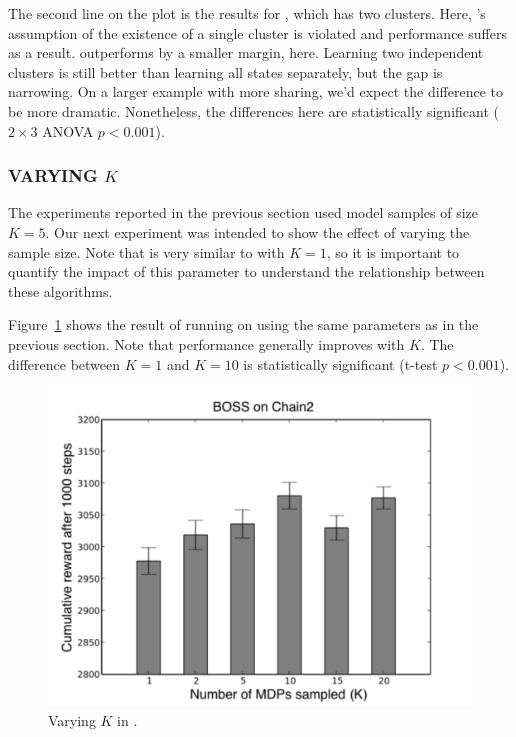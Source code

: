 The second line on the plot is the results for , which has two
clusters.  Here, 's assumption of the existence of a single
cluster is violated and performance suffers as a result.  
outperforms  by a smaller margin, here.  Learning two independent
clusters is still better than learning all states separately, but the
gap is narrowing.  On a larger example with more sharing, we'd expect
the difference to be more dramatic.  Nonetheless, the differences here
are statistically significant ($2\times 3$ ANOVA $p<0.001$).


\subsubsection{VARYING $K$}

The experiments reported in the previous section used model samples of
size $K=5$.  Our next experiment was intended to show the effect of varying the
sample size.  Note that  is very similar to  with $K=1$,
so it is important to quantify the impact of this parameter to
understand the relationship between these algorithms.

Figure~\ref{f:varyk} shows the result of running  on  using
the same parameters as in the previous section.  Note that performance
generally improves with $K$.  The difference between $K=1$ and $K=10$ is
statistically significant (t-test $p<0.001$).

\begin{figure}[t]
\begin{center}
\includegraphics[width=1.0\linewidth]{figures/varyk}
\caption{Varying $K$ in .}
\label{f:varyk}
\end{center}
\end{figure}


